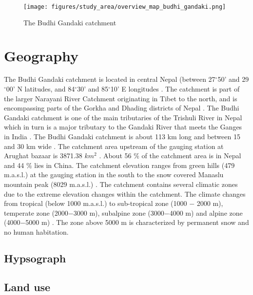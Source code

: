 
\begin{figure}[ht]
    \centering
    \texttt{[image: figures/study\_area/overview\_map\_budhi\_gandaki.png]}
    \caption{The Budhi Gandaki catchment}
    \label{fig:overview_budhi_gandaki}
\end{figure}


\section{Geography}


The Budhi Gandaki catchment is located in central Nepal (between 27$^{\circ}$50' and 29$^{\circ}$00' N latitudes, and 84$^{\circ}$30' and 85$^{\circ}$10' E longitudes \autocite{marahattaHydrologicalModelingBetter2021}. The catchment is part of the larger Narayani River Catchment originating in Tibet to the north, and is encompassing parts of the Gorkha and Dhading districts of Nepal \autocite{devkotaClimateChangeAdaptation2017}. The Budhi Gandaki catchment is one of the main tributaries of the Trishuli River in Nepal which in turn is a major tributary to the Gandaki River that meets the Ganges in India \autocite{khatriModellingStreamflowSnow2018}. The Budhi Gandaki catchment is about 113 km long and between 15 and 30 km wide \autocite{marahattaHydrologicalModelingBetter2021}. The catchment area upstream of the gauging station at Arughat bazaar is 3871.38 $km^{2}$ \autocite{khatriModellingStreamflowSnow2018}. About 56 $\%$ of the catchment area is in Nepal and 44 $\%$ lies in China. The catchment elevation ranges from green hills (479 m.a.s.l.) at the gauging station in the south to the snow covered Manaslu mountain peak (8029 m.a.s.l.) \autocite{khatriModellingStreamflowSnow2018}. The catchment contains several climatic zones due to the extreme elevation changes within the catchment. The climate changes from tropical (below 1000 m.a.s.l.) to sub-tropical zone (1000 $-$ 2000 m), temperate zone (2000$-$3000 m), subalpine zone (3000$-$4000 m) and alpine zone (4000$-$5000 m) \autocite{khatriModellingStreamflowSnow2018}. The zone above 5000 m is characterized by permanent snow and no human habitation.

\subsection{Hypsograph}

\subsection{Land use}

